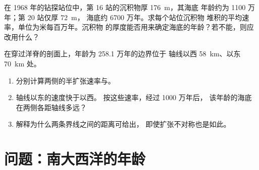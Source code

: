 \begin{exercise}[$\star\star\star$]\label{exo:g11:drift-to-spreading:14}
在 1968 年的钻探站位中，第 16 站的沉积物厚 \qty{176}{m}，其海底
年龄约为 1100 万年；第 20 站仅厚 \qty{72}{m}，
海底约 6700 万年。求每个站位沉积物
堆积的平均速率，单位为米每百万年。沉积物
的厚度能否用来确定海底的年龄？若不能，则应改用什么？
\end{exercise}

\begin{exercise}[$\star\star\star$]\label{exo:g11:drift-to-spreading:15}
在穿过洋脊的剖面上，年龄为 258.1 万年的边界位于
轴线以西 \qty{58}{km}、以东 \qty{70}{km} 处。
\begin{enumerate}
  \item 分别计算两侧的半扩张速率与。
        \item 轴线以东的速度快于以西。
        按这些速率，经过 1000 万年后，
        该年龄的海底在两侧各距轴线多远？
        \item 解释为什么两条界线之间的距离可给出，
        即使扩张不对称也是如此。
\end{enumerate}
\end{exercise}

\section{问题：南大西洋的年龄}

